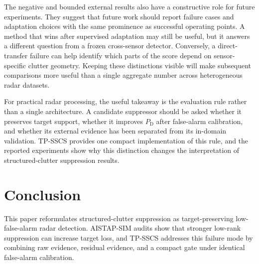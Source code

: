 \documentclass[journal]{IEEEtran}
\begin{document}
The negative and bounded external results also have a constructive role for future experiments. They suggest that future work should report failure cases and adaptation choices with the same prominence as successful operating points. A method that wins after supervised adaptation may still be useful, but it answers a different question from a frozen cross-sensor detector. Conversely, a direct-transfer failure can help identify which parts of the score depend on sensor-specific clutter geometry. Keeping these distinctions visible will make subsequent comparisons more useful than a single aggregate number across heterogeneous radar datasets.

For practical radar processing, the useful takeaway is the evaluation rule rather than a single architecture. A candidate suppressor should be asked whether it preserves target support, whether it improves $P_{\mathrm{D}}$ after false-alarm calibration, and whether its external evidence has been separated from its in-domain validation. TP-SSCS provides one compact implementation of this rule, and the reported experiments show why this distinction changes the interpretation of structured-clutter suppression results.

\section{Conclusion}

This paper reformulates structured-clutter suppression as target-preserving low-false-alarm radar detection. AISTAP-SIM audits show that stronger low-rank suppression can increase target loss, and TP-SSCS addresses this failure mode by combining raw evidence, residual evidence, and a compact gate under identical false-alarm calibration.
\end{document}

